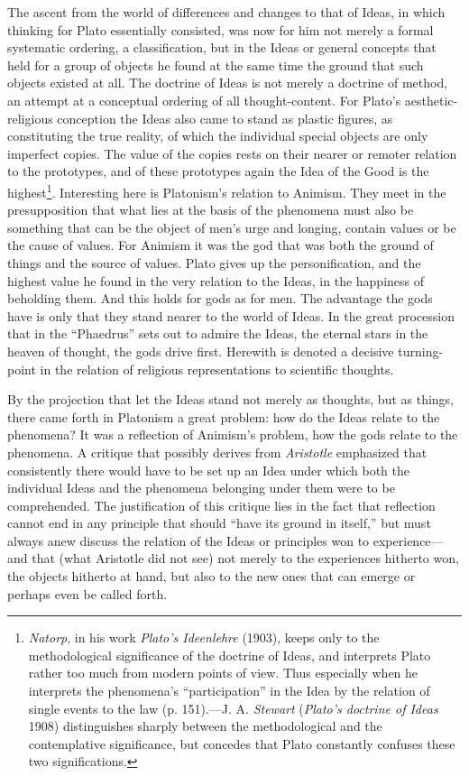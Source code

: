 \documentclass[12pt,a4paper]{book}
\newcommand{\opage}[1]{\marginnote{\footnotesize\textit{[#1]}}}
\begin{document}
The ascent from the world of differences and changes to that of Ideas, in
which thinking for Plato essentially consisted, was now for him not merely
a formal systematic ordering, a classification, but in the Ideas or general
concepts that held for a group of objects he found at the same time the
ground that such objects existed at all. The doctrine of Ideas is not
merely a doctrine of method, an attempt at a conceptual ordering of all
thought-content. For Plato's aesthetic-religious conception the Ideas also
came to stand as plastic figures, as constituting the true reality, of
which the individual special objects are only imperfect copies. The value
of the copies rests on their nearer or remoter relation to the prototypes,
and of these prototypes again the Idea of the Good is the
highest\footnote{\emph{Natorp}, in his work \emph{Plato's Ideenlehre}
(1903), keeps only to the methodological significance of the doctrine of
Ideas, and interprets Plato rather too much from modern points of view.
Thus especially when he interprets the phenomena's ``participation'' in the
Idea by the relation of single events to the law (p. 151).---J. A.
\emph{Stewart} (\emph{Plato's doctrine of Ideas} 1908) distinguishes
sharply between the methodological and the contemplative significance, but
concedes that Plato constantly confuses these two significations.}.
Interesting here is Platonism's relation to Animism. They meet in the
presupposition that what lies at the basis of the phenomena must also be
something that can be the object of men's urge and longing, contain values
or be the cause of values. For Animism it was the god that was both the
ground of things and the source of values. Plato gives up the
personification, and the highest value he found in the very relation to the
Ideas, in the happiness of beholding them. And this holds for gods as for
men. The advantage the gods have is only that they stand nearer to the
world of Ideas. In the great procession that in the ``Phaedrus'' sets out
to admire the Ideas, the eternal stars in \opage{120}the heaven of thought, the gods
drive first. Herewith is denoted a decisive turning-point in the relation
of religious representations to scientific thoughts.

By the projection that let the Ideas stand not merely as thoughts, but as
things, there came forth in Platonism a great problem: how do the Ideas
relate to the phenomena? It was a reflection of Animism's problem, how the
gods relate to the phenomena. A critique that possibly derives from
\emph{Aristotle} emphasized that consistently there would have to be set up
an Idea under which both the individual Ideas and the phenomena belonging
under them were to be comprehended. The justification of this critique lies
in the fact that reflection cannot end in any principle that should ``have
its ground in itself,'' but must always anew discuss the relation of the
Ideas or principles won to experience---and that (what Aristotle did not
see) not merely to the experiences hitherto won, the objects hitherto at
hand, but also to the new ones that can emerge or perhaps even be called
forth.
\end{document}
